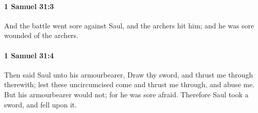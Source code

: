 		\paragraph{1 Samuel 31:3} %
			\label{1SAMUEL-31-3}

			And the battle went sore against Saul, and the archers hit him; and he was sore wounded of the archers.


		\paragraph{1 Samuel 31:4} %
			\label{1SAMUEL-31-4}

			Then said Saul unto his armourbearer, Draw thy sword, and thrust me through therewith; lest these uncircumcised come and thrust me through, and abuse me. But his armourbearer would not; for he was sore afraid. Therefore Saul took a sword, and fell upon it.


